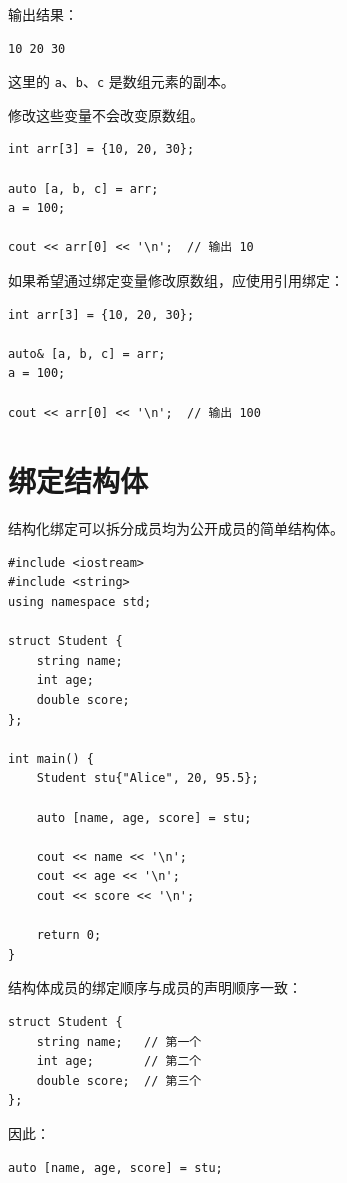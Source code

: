 \documentclass[UTF8,12pt,a4paper]{ctexart}
\begin{document}
输出结果：

\begin{verbatim}
10 20 30
\end{verbatim}

这里的 \texttt{a}、\texttt{b}、\texttt{c} 是数组元素的副本。

修改这些变量不会改变原数组。

\begin{lstlisting}
int arr[3] = {10, 20, 30};

auto [a, b, c] = arr;
a = 100;

cout << arr[0] << '\n';  // 输出 10
\end{lstlisting}

如果希望通过绑定变量修改原数组，应使用引用绑定：

\begin{lstlisting}
int arr[3] = {10, 20, 30};

auto& [a, b, c] = arr;
a = 100;

cout << arr[0] << '\n';  // 输出 100
\end{lstlisting}

\section{绑定结构体}

结构化绑定可以拆分成员均为公开成员的简单结构体。

\begin{lstlisting}
#include <iostream>
#include <string>
using namespace std;

struct Student {
    string name;
    int age;
    double score;
};

int main() {
    Student stu{"Alice", 20, 95.5};

    auto [name, age, score] = stu;

    cout << name << '\n';
    cout << age << '\n';
    cout << score << '\n';

    return 0;
}
\end{lstlisting}

结构体成员的绑定顺序与成员的声明顺序一致：

\begin{lstlisting}
struct Student {
    string name;   // 第一个
    int age;       // 第二个
    double score;  // 第三个
};
\end{lstlisting}

因此：

\begin{lstlisting}
auto [name, age, score] = stu;
\end{lstlisting}
\end{document}

